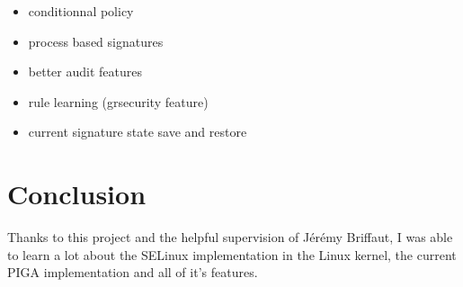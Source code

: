 \documentclass[pdftex,a4paper,titlepage,11pt]{article}
\begin{document}
\begin{itemize}
	\item conditionnal policy
	\item process based signatures
	\item better audit features
	\item rule learning (grsecurity feature)
	\item current signature state save and restore
\end{itemize}

\newpage

\section*{Conclusion} 

Thanks to this project and the helpful supervision of Jérémy Briffaut, I was able to learn a lot about the SELinux implementation in the Linux kernel, the current PIGA implementation and all of it's features.


%
%
%
%
%
%

\newpage

\end{document}
